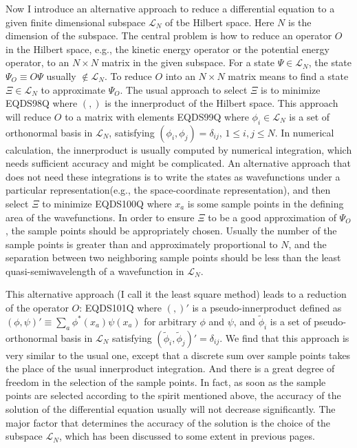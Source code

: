 Now I introduce an alternative approach to reduce a differential equation to
a given finite dimensional subspace $\mathcal{L}_N$ of tbe Hilbert space.
Here $N$ is the dimension of the subspace. The central problem is how
to reduce an operator $O$ in the Hilbert
space, e.g., the kinetic energy operator or the potential energy operator,
to an $N\times N$ matrix in the given subspace. For a state
$\Psi\in\mathcal{L}_N$, the state $\Psi_O\equiv O\Psi$ usually
$\notin\mathcal{L}_N$. To reduce $O$ into an $N\times N$ matrix means to
find a state $\Xi\in\mathcal{L}_N$ to approximate $\Psi_O$. The usual approach
to select $\Xi$ is to minimize
 EQDS98Q 
where $(,)$ is the
innerproduct of the Hilbert space. This approach will reduce $O$ to a matrix
with elements
 EQDS99Q 
where $\phi_i\in\mathcal{L}_N$ is a set of orthonormal basis in $\mathcal{L}_N$,
satisfying $(\phi_i, \phi_j)=\delta_{ij}$, $1\le i, j\le N$. In numerical
calculation, the innerproduct is usually computed by numerical integration,
which needs sufficient accuracy and might be complicated. An alternative approach
that does not need these integrations is to write the states as
wavefunctions under a particular representation(e.g., the space-coordinate
representation), and then select $\Xi$ to minimize
 EQDS100Q 
where $x_a$ is some sample points in the defining area of the wavefunctions.
In order to ensure $\Xi$ to be a good approximation of $\Psi_O$, the sample
points should be appropriately chosen. Usually the number of the sample points
is greater than and approximately proportional to $N$, and the separation between
two neighboring sample points should be less than the least quasi-semiwavelength
of a wavefunction in $\mathcal{L}_N$.

This alternative approach (I call it the least square method)
leads to a reduction of the operator $O$:
 EQDS101Q 
where $(,)'$ is a pseudo-innerproduct defined as
$(\phi,\psi)'\equiv\sum_{a}\phi^{*}(x_{a})\psi(x_{a})$ for arbitrary $\phi$
and $\psi$, and $\tilde{\phi}_i$ is a set of pseudo-orthonormal basis in
$\mathcal{L}_N$ satisfying $(\tilde{\phi}_{i}, \tilde{\phi}_{j})'=\delta_{ij}$.
We find that this approach is very similar to the usual one, except that
a discrete sum over sample points takes the place of the usual innerproduct
integration. And there is a great degree of freedom in the selection of the sample
points. In fact, as soon as the sample points are selected according to the
spirit mentioned above, the accuracy of the solution of the differential
equation usually will not decrease significantly. The major factor that determines
the accuracy of the solution is the choice of the subspace $\mathcal{L}_N$, which
has been discussed to some extent in previous pages.

